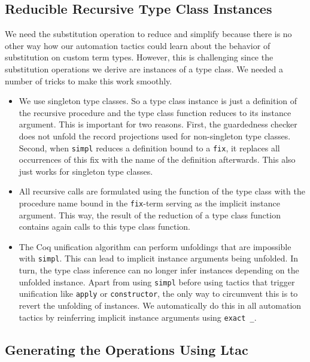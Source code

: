 \documentclass{scrartcl}
\newcommand{\lst}{\lstinline}
\begin{document}
\subsection{Reducible Recursive Type Class Instances}
\label{sec:reduc-recurs-inst}

We need the substitution operation to reduce and simplify because there is no other way how our automation tactics could learn about the behavior of substitution on custom term types. However, this is challenging since the substitution operations we derive are instances of a type class. We needed a number of tricks to make this work smoothly.
\begin{itemize}
\item We use singleton type classes. So a type class instance is just a definition of the recursive procedure and the type class function reduces to its instance argument. This is important for two reasons. 
First, the guardedness checker does not unfold the record projections used for non-singleton type classes.
Second, when \lst$simpl$ reduces a definition bound to a \lst$fix$, it replaces all occurrences of this fix with the name of the definition afterwards. This also just works for singleton type classes.
\item All recursive calls are formulated using the function of the type class with the procedure name bound in the \lst$fix$-term serving as the implicit instance argument. This way, the result of the reduction of a type class function contains again calls to this type class function.
\item The Coq unification algorithm can perform unfoldings that are impossible with \lst$simpl$. This can lead to implicit instance arguments being unfolded. In turn, the type class inference can no longer infer instances depending on the unfolded instance. Apart from using \lst$simpl$ before using tactics that trigger unification like \lst$apply$ or \lst$constructor$, the only way to circumvent this is to revert the unfolding of instances. We automatically do this in all automation tactics by reinferring implicit instance arguments using \lst$exact _$.

\end{itemize}

\subsection{Generating the Operations Using Ltac}
\label{sec:gener-ltac}
\end{document}
